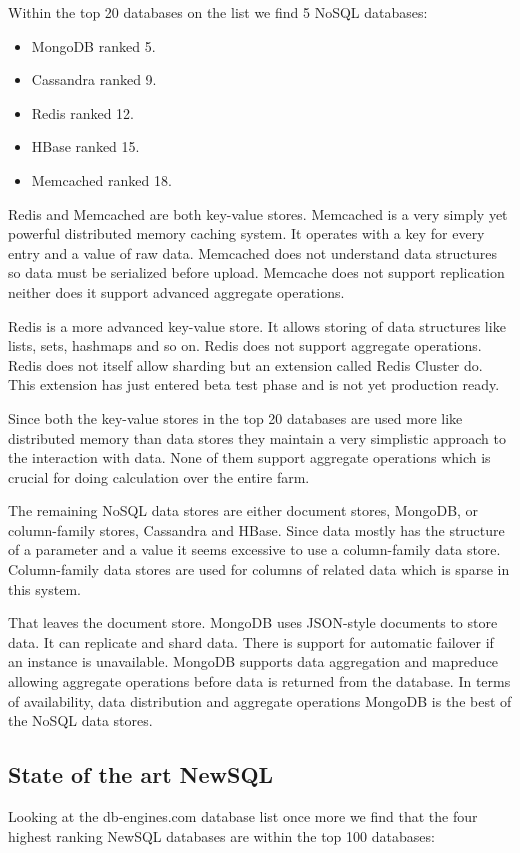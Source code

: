 Within the top 20 databases on the list we find 5 NoSQL databases:

\begin{itemize}
\item MongoDB\cite{mongodb} ranked 5.
\item Cassandra\cite{cassandra} ranked 9.
\item Redis\cite{redis} ranked 12.
\item HBase\cite{hbase} ranked 15.
\item Memcached\cite{memcached} ranked 18.
\end{itemize}

Redis and Memcached are both key-value stores. Memcached is a very simply yet powerful distributed memory caching system.
It operates with a key for every entry and a value of raw data.
Memcached does not understand data structures so data must be serialized before upload.
Memcache does not support replication neither does it support advanced aggregate operations.

Redis is a more advanced key-value store.
It allows storing of data structures like lists, sets, hashmaps and so on.
Redis does not support aggregate operations.
Redis does not itself allow sharding but an extension called Redis Cluster do. This extension has just entered beta test phase and is not yet production ready.

Since both the key-value stores in the top 20 databases are used more like distributed memory than data stores they maintain a very simplistic approach to the interaction with data.
None of them support aggregate operations which is crucial for doing calculation over the entire farm.

The remaining NoSQL data stores are either document stores, MongoDB, or column-family stores, Cassandra and HBase.
Since data mostly has the structure of a parameter and a value it seems excessive to use a column-family data store. 
Column-family data stores are used for columns of related data which is sparse in this system.

That leaves the document store. MongoDB uses JSON-style documents to store data.
It can replicate and shard data. 
There is support for automatic failover if an instance is unavailable.
MongoDB supports data aggregation and mapreduce allowing aggregate operations before data is returned from the database.
In terms of availability, data distribution and aggregate operations MongoDB is the best of the NoSQL data stores.

\subsection{State of the art NewSQL}
Looking at the db-engines.com database list once more we find that the four highest ranking NewSQL databases are within the top 100 databases:

